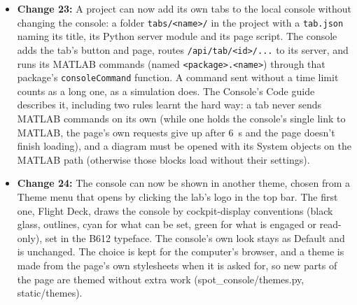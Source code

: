 \documentclass[11pt]{article}
\begin{document}
\begin{itemize}[label={\textcolor{primaryColor}{\textbullet}}]
    \item \textbf{Change 23:} A project can now add its own tabs to the local console without changing the console: a folder \texttt{tabs/<name>/} in the project with a \texttt{tab.json} naming its title, its Python server module and its page script. The console adds the tab's button and page, routes \texttt{/api/tab/<id>/...} to its server, and runs its MATLAB commands (named \texttt{<package>.<name>}) through that package's \texttt{consoleCommand} function. A command sent without a time limit counts as a long one, as a simulation does. The Console's Code guide describes it, including two rules learnt the hard way: a tab never sends MATLAB commands on its own (while one holds the console's single link to MATLAB, the page's own requests give up after 6~s and the page doesn't finish loading), and a diagram must be opened with its System objects on the MATLAB path (otherwise those blocks load without their settings).
    \item \textbf{Change 24:} The console can now be shown in another theme, chosen from a Theme menu that opens by clicking the lab's logo in the top bar. The first one, Flight Deck, draws the console by cockpit-display conventions (black glass, outlines, cyan for what can be set, green for what is engaged or read-only), set in the B612 typeface. The console's own look stays as Default and is unchanged. The choice is kept for the computer's browser, and a theme is made from the page's own stylesheets when it is asked for, so new parts of the page are themed without extra work (spot\_console/themes.py, static/themes).
\end{itemize}

\end{document}

